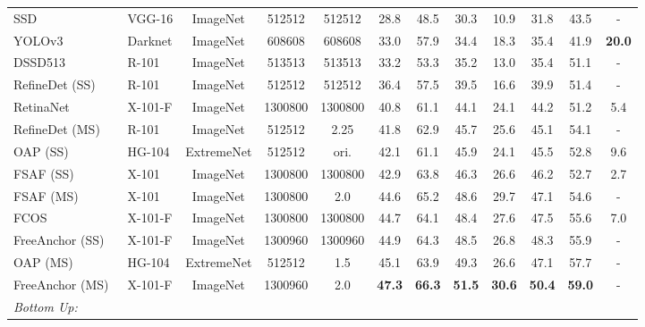 \documentclass[runningheads]{llncs}
\begin{document}
\begin{table}[H]
{\begin{tabular}{llcccccccccc}
SSD~\cite{ssd}         & VGG-16                 &  ImageNet & 512512 & 512512 & 28.8 & 48.5 & 30.3 & 10.9 & 31.8 & 43.5         & -\\
YOLOv3~\cite{yolo3}        & Darknet                  &  ImageNet & 608608 & 608608& 33.0 & 57.9 &  34.4 & 18.3 &  35.4 & 41.9         & \textbf{20.0}\\
DSSD513~\cite{dssd} & R-101         &  ImageNet & 513513 & 513513& 33.2& 53.3 & 35.2 & 13.0 & 35.4 &51.1        & -\\ 
RefineDet (SS)~\cite{refinedet} & R-101 & ImageNet & 512512 & 512512&  36.4 & 57.5 & 39.5 & 16.6 & 39.9 & 51.4 & - \\
RetinaNet~\cite{retinanet} & X-101-F & ImageNet & 1300800 & 1300800 & 40.8 & 61.1 & 44.1 & 24.1 & 44.2 & 51.2 & 5.4\\
RefineDet (MS)~\cite{refinedet} & R-101 & ImageNet & 512512 & 2.25 & 41.8 & 62.9 & 45.7 &  25.6 & 45.1 & 54.1 & - \\
OAP (SS)~\cite{centernet} & HG-104 & ExtremeNet &  512512 & ori. & 42.1 & 61.1 & 45.9 &  24.1 & 45.5 & 52.8 & 9.6 \\
FSAF (SS)~\cite{fsaf} & X-101 & ImageNet & 1300800 & 1300800 &   42.9  &  63.8 &  46.3 &  26.6 &  46.2  &  52.7 &  2.7 \\
FSAF (MS)~\cite{fsaf} & X-101 & ImageNet &  1300800 & 2.0 &   44.6 &  65.2 &  48.6 &  29.7 &  47.1  &  54.6 &  - \\
FCOS~\cite{fcos}  & X-101-F  & ImageNet &  1300800 & 1300800 & 44.7 & 64.1 &  48.4 &  27.6 &  47.5 &    55.6 & 7.0 \\
FreeAnchor (SS)~\cite{freeanchor} & X-101-F & ImageNet &  1300960 & 1300960 & 44.9 & 64.3 & 48.5 & 26.8 & 48.3 & 55.9 & - \\
OAP (MS)~\cite{centernet} & HG-104 & ExtremeNet &  512512 & 1.5 & 45.1 & 63.9 & 49.3 &  26.6 & 47.1 & 57.7  & - \\
FreeAnchor (MS)~\cite{freeanchor} & X-101-F & ImageNet &   1300960 & 2.0& \textbf{47.3} &   \textbf{66.3} &  \textbf{51.5} &   \textbf{30.6} & \textbf{50.4} &  \textbf{59.0} & - \\


\textit{Bottom Up:} & & & & & & & &&&& \\



\end{tabular}}
\end{table}
\end{document}
